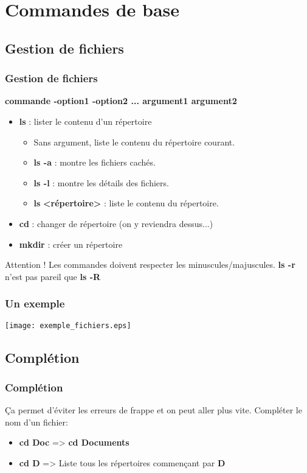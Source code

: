 \documentclass{beamer}
\begin{document}
    \section{Commandes de base}
    \subsection{Gestion de fichiers}
    \begin{frame}
        \frametitle{Gestion de fichiers}
        {\bf commande -option1 -option2 ... argument1 argument2}
        \begin{itemize}
            \item {\bf ls} : lister le contenu d'un répertoire
                \begin{itemize}
                    \item Sans argument, liste le contenu du répertoire courant.
                    \item {\bf ls -a} : montre les fichiers cachés.
                    \item {\bf ls -l} : montre les détails des fichiers.
                    \item {\bf ls }{\bf <répertoire>} : liste le contenu du répertoire.
                \end{itemize}
            \item {\bf cd} : changer de répertoire (on y reviendra dessus...)
            \item {\bf mkdir} : créer un répertoire
        \end{itemize}
        \begin{block}{Attention !}
            Les commandes doivent respecter les minuscules/majuscules.\newline
            {\bf ls -r} n'est pas pareil que {\bf ls -R}
        \end{block}
    \end{frame}

    \begin{frame}
        \frametitle{Un exemple}
        \texttt{[image: exemple\_fichiers.eps]}
    \end{frame}

    \subsection{Complétion}
    \begin{frame}
        \frametitle{Complétion}
        Ça permet d'éviter les erreurs de frappe et on peut aller plus vite.\newline \newline
        Compléter le nom d'un fichier:
        \begin{itemize}
            \item {\bf cd Doc} \Tab => {\bf cd Documents}
            \item {\bf cd D} \Tab \Tab
                \newline => Liste tous les répertoires commençant par {\bf D}
        \end{itemize}
    \end{frame}
\end{document}
